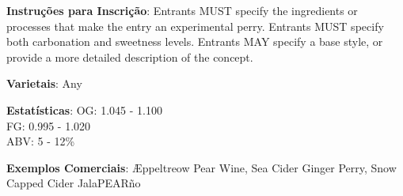 \textbf{Instruções para Inscrição}: Entrants MUST specify the ingredients or processes that make the entry an experimental perry. Entrants MUST specify both carbonation and sweetness levels. Entrants MAY specify a base style, or provide a more detailed description of the concept.

\textbf{Varietais}: Any

\textbf{Estatísticas}: OG: 1.045 - 1.100 \\
\phantom{ } \hspace{16.5mm} FG: 0.995 - 1.020 \\
\phantom{ } \hspace{16.5mm} ABV: 5 - 12\%

\textbf{Exemplos Comerciais}: Æppeltreow Pear Wine, Sea Cider Ginger Perry, Snow Capped Cider JalaPEARño